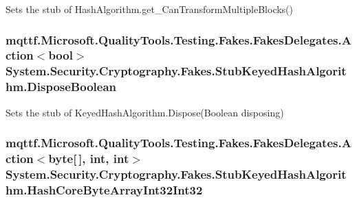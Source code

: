 Sets the stub of Hash\-Algorithm.\-get\-\_\-\-Can\-Transform\-Multiple\-Blocks()

\hypertarget{class_system_1_1_security_1_1_cryptography_1_1_fakes_1_1_stub_keyed_hash_algorithm_a0e6d0b5484c82c2fc55a56274926bbe5}{
\subsubsection[{Dispose\-Boolean}]{\setlength{\rightskip}{0pt plus 5cm}mqttf.\-Microsoft.\-Quality\-Tools.\-Testing.\-Fakes.\-Fakes\-Delegates.\-Action$<$bool$>$ System.\-Security.\-Cryptography.\-Fakes.\-Stub\-Keyed\-Hash\-Algorithm.\-Dispose\-Boolean}}\label{class_system_1_1_security_1_1_cryptography_1_1_fakes_1_1_stub_keyed_hash_algorithm_a0e6d0b5484c82c2fc55a56274926bbe5}


Sets the stub of Keyed\-Hash\-Algorithm.\-Dispose(\-Boolean disposing)

\hypertarget{class_system_1_1_security_1_1_cryptography_1_1_fakes_1_1_stub_keyed_hash_algorithm_a503f7c352ef87918ae0571bcc1a13c52}{
\subsubsection[{Hash\-Core\-Byte\-Array\-Int32\-Int32}]{\setlength{\rightskip}{0pt plus 5cm}mqttf.\-Microsoft.\-Quality\-Tools.\-Testing.\-Fakes.\-Fakes\-Delegates.\-Action$<$byte\mbox{[}$\,$\mbox{]}, int, int$>$ System.\-Security.\-Cryptography.\-Fakes.\-Stub\-Keyed\-Hash\-Algorithm.\-Hash\-Core\-Byte\-Array\-Int32\-Int32}}\label{class_system_1_1_security_1_1_cryptography_1_1_fakes_1_1_stub_keyed_hash_algorithm_a503f7c352ef87918ae0571bcc1a13c52}


